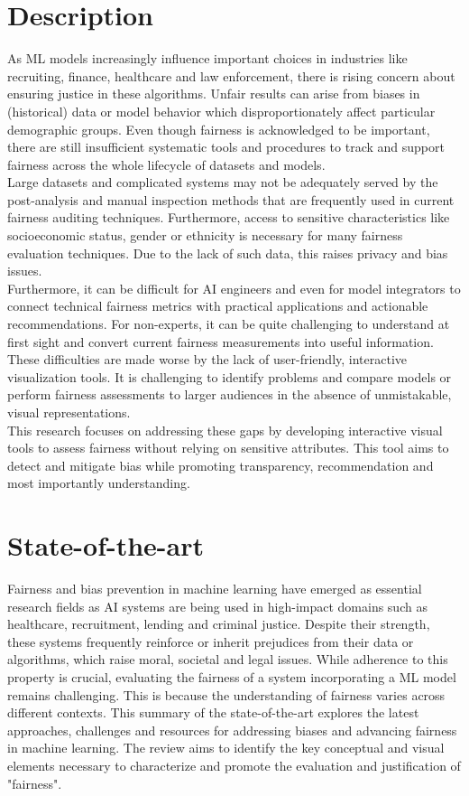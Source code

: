 \documentclass[runningheads]{llncs}
\begin{document}
\section{Description}
As ML models increasingly influence important choices in industries like recruiting, finance, healthcare and law enforcement, there is rising concern about ensuring justice in these algorithms. Unfair results can arise from biases in (historical) data or model behavior which disproportionately affect particular demographic groups. Even though fairness is acknowledged to be important, there are still insufficient systematic tools and procedures to track and support fairness across the whole lifecycle of datasets and models.\\

Large datasets and complicated systems may not be adequately served by the post-analysis and manual inspection methods that are frequently used in current fairness auditing techniques. Furthermore, access to sensitive characteristics like socioeconomic status, gender or ethnicity is necessary for many fairness evaluation techniques. Due to the lack of such data, this raises privacy and bias issues.\\

Furthermore, it can be difficult for AI engineers and even for model integrators to connect technical fairness metrics with practical applications and actionable recommendations. For non-experts, it can be quite challenging to understand at first sight and convert current fairness measurements into useful information. These difficulties are made worse by the lack of user-friendly, interactive visualization tools. It is challenging to identify problems and compare models or perform fairness assessments to larger audiences in the absence of unmistakable, visual representations.\\

This research focuses on addressing these gaps by developing interactive visual tools to assess fairness without relying on sensitive attributes. This tool aims to detect and mitigate bias while promoting transparency, recommendation and most importantly understanding. 

\section{State-of-the-art}
Fairness and bias prevention in machine learning have emerged as essential research fields as AI systems are being used in high-impact domains such as healthcare, recruitment, lending and criminal justice. Despite their strength, these systems frequently reinforce or inherit prejudices from their data or algorithms, which raise moral, societal and legal issues. While adherence to this property is crucial, evaluating the fairness of a system incorporating a ML model remains challenging. This is because the understanding of fairness varies across different contexts. This summary of the state-of-the-art explores the latest approaches, challenges and resources for addressing biases and advancing fairness in machine learning. The review aims to identify the key conceptual and visual elements necessary to characterize and promote the evaluation and justification of "fairness".
\end{document}

